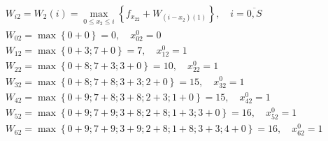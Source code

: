\begin{align*}
     & W_{i2} = W_2(i) = \max\limits_{0 \leq x_2 \leq i} \left\{ f_{x_22} + W_{(i-x_2)(1)} \right\}, \quad i = \overline{0, S} \\
     & W_{02} = \max \left\{0 + 0\right\} = 0, \quad x_{02}^0 = 0                                                              \\
     & W_{12} = \max \left\{0 + 3; 7 + 0\right\} = 7, \quad x_{12}^0 = 1                                                       \\
     & W_{22} = \max \left\{0 + 8; 7 + 3; 3 + 0\right\} = 10, \quad x_{22}^0 = 1                                               \\
     & W_{32} = \max \left\{0 + 8; 7 + 8; 3 + 3; 2 + 0\right\} = 15, \quad x_{32}^0 = 1                                        \\
     & W_{42} = \max \left\{0 + 9; 7 + 8; 3 + 8; 2 + 3; 1 + 0\right\} = 15, \quad x_{42}^0 = 1                                 \\
     & W_{52} = \max \left\{0 + 9; 7 + 9; 3 + 8; 2 + 8; 1 + 3; 3 + 0\right\} = 16, \quad x_{52}^0 = 1                          \\
     & W_{62} = \max \left\{0 + 9; 7 + 9; 3 + 9; 2 + 8; 1 + 8; 3 + 3; 4 + 0\right\} = 16, \quad x_{62}^0 = 1
\end{align*}


